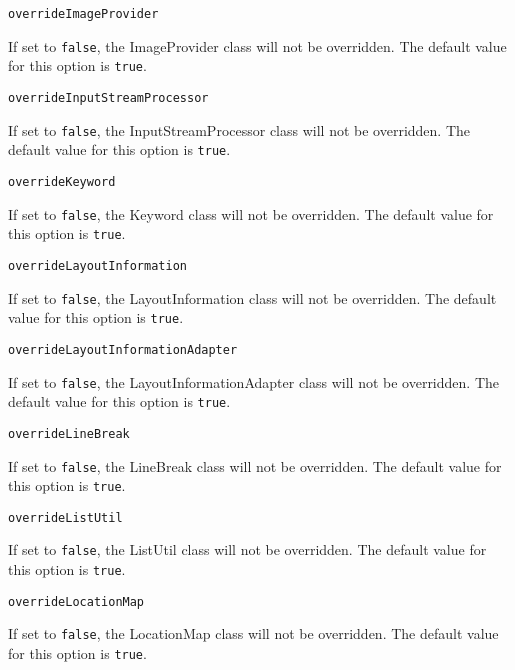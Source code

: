 \noindent\texttt{overrideImageProvider}
\begin{myindentpar}{1cm}
If set to \texttt{false}, the ImageProvider class will not be overridden. The default value for this option is \texttt{true}.
\end{myindentpar}

\noindent\texttt{overrideInputStreamProcessor}
\begin{myindentpar}{1cm}
If set to \texttt{false}, the InputStreamProcessor class will not be overridden. The default value for this option is \texttt{true}.
\end{myindentpar}

\noindent\texttt{overrideKeyword}
\begin{myindentpar}{1cm}
If set to \texttt{false}, the Keyword class will not be overridden. The default value for this option is \texttt{true}.
\end{myindentpar}

\noindent\texttt{overrideLayoutInformation}
\begin{myindentpar}{1cm}
If set to \texttt{false}, the LayoutInformation class will not be overridden. The default value for this option is \texttt{true}.
\end{myindentpar}

\noindent\texttt{overrideLayoutInformationAdapter}
\begin{myindentpar}{1cm}
If set to \texttt{false}, the LayoutInformationAdapter class will not be overridden. The default value for this option is \texttt{true}.
\end{myindentpar}

\noindent\texttt{overrideLineBreak}
\begin{myindentpar}{1cm}
If set to \texttt{false}, the LineBreak class will not be overridden. The default value for this option is \texttt{true}.
\end{myindentpar}

\noindent\texttt{overrideListUtil}
\begin{myindentpar}{1cm}
If set to \texttt{false}, the ListUtil class will not be overridden. The default value for this option is \texttt{true}.
\end{myindentpar}

\noindent\texttt{overrideLocationMap}
\begin{myindentpar}{1cm}
If set to \texttt{false}, the LocationMap class will not be overridden. The default value for this option is \texttt{true}.
\end{myindentpar}

